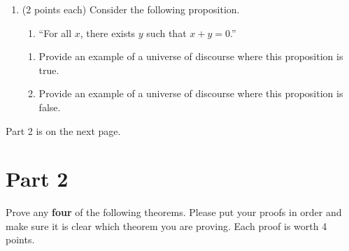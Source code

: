 \documentclass[11pt]{article}
\theoremstyle{definition}
\begin{document}
\begin{enumerate}
\item (2 points each)  Consider the following proposition.
\begin{enumerate}
\item[] ``For all $x$, there exists $y$ such that $x+y=0$.''
\end{enumerate}

\begin{enumerate}
\item Provide an example of a universe of discourse where this proposition is true.

\item Provide an example of a universe of discourse where this proposition is false.

\end{enumerate}

%
%
%
%

\end{enumerate}

Part 2 is on the next page.

\newpage

\section*{Part 2}

Prove any \textbf{four} of the following theorems.  Please put your proofs in order and make sure it is clear which theorem you are proving.  Each proof is worth 4 points.

%
\end{document}
